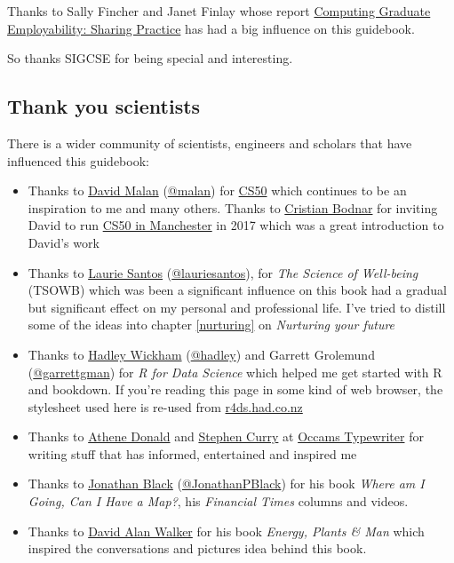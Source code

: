\documentclass[
]{book}
\providecommand{\tightlist}{%
  \setlength{\itemsep}{0pt}\setlength{\parskip}{0pt}}
\begin{document}
Thanks to Sally Fincher and Janet Finlay whose report \href{https://kar.kent.ac.uk/53848}{Computing Graduate Employability: Sharing Practice} \citep{fincherreview} has had a big influence on this guidebook.

So thanks SIGCSE for being special and interesting. 🙏

\hypertarget{scientists}{%
\subsection{Thank you scientists}\label{scientists}}

There is a wider community of scientists, engineers and scholars that have influenced this guidebook:

\begin{itemize}
\tightlist
\item
  Thanks to \href{https://en.wikipedia.org/wiki/David_J._Malan}{David Malan} (\href{https://cs.harvard.edu/malan/}{@malan}) for \href{https://en.wikipedia.org/wiki/CS50}{CS50} which continues to be an inspiration to me and many others. \citep{cs50, cs50zoom, CS502021} Thanks to \href{https://crisbodnar.github.io/}{Cristian Bodnar} for inviting David to run \href{http://cs50.hacksoc.com}{CS50 in Manchester} in 2017 which was a great introduction to David's work \citep{cs50mcr}
\item
  Thanks to \href{https://en.wikipedia.org/wiki/Laurie_R._Santos}{Laurie Santos} (\href{https://twitter.com/lauriesantos}{@lauriesantos}), for \emph{The Science of Well-being} (TSOWB) \citep{lauriesantos} which was been a significant influence on this book had a gradual but significant effect on my personal and professional life. I've tried to distill some of the ideas into chapter \ref{nurturing} on \emph{Nurturing your future}
\item
  Thanks to \href{https://en.wikipedia.org/wiki/Hadley_Wickham}{Hadley Wickham} (\href{https://github.com/hadley}{@hadley}) and Garrett Grolemund (\href{https://github.com/garrettgman}{@garrettgman}) for \emph{R for Data Science} \citep{r4ds} which helped me get started with R and bookdown. If you're reading this page in some kind of web browser, the stylesheet used here is re-used from \href{https://r4ds.had.co.nz/}{r4ds.had.co.nz}
\item
  Thanks to \href{https://en.wikipedia.org/wiki/Athene_Donald}{Athene Donald} and \href{https://occamstypewriter.org/scurry/}{Stephen Curry} at \href{http://occamstypewriter.org/athenedonald/}{Occams Typewriter} for writing stuff that has informed, entertained and inspired me
\item
  Thanks to \href{https://www.new.ox.ac.uk/node/1003}{Jonathan Black} (\href{https://twitter.com/JonathanPBlack}{@JonathanPBlack}) for his book \emph{Where am I Going, Can I Have a Map?}, his \emph{Financial Times} columns and videos. \citep{jonathanblack, ft}
\item
  Thanks to \href{https://en.wikipedia.org/wiki/David_Alan_Walker}{David Alan Walker} for his book \emph{Energy, Plants \& Man} which inspired the conversations and pictures idea behind this book. \citep{epm}
\end{itemize}
\end{document}
